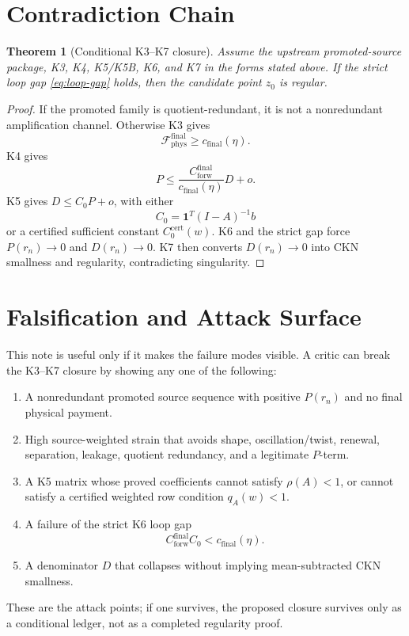\documentclass[11pt]{article}
\newtheorem{theorem}{Theorem}
\begin{document}
\clearpage
\section{Contradiction Chain}
\label{sec:chain}

\begin{theorem}[Conditional K3--K7 closure]
\label{thm:closure}
Assume the upstream promoted-source package, K3, K4, K5/K5B, K6, and K7 in the
forms stated above.  If the strict loop gap \eqref{eq:loop-gap} holds, then the
candidate point \(z_0\) is regular.
\end{theorem}

\begin{proof}
If the promoted family is quotient-redundant, it is not a nonredundant
amplification channel.  Otherwise K3 gives
\[
\mathcal F_{\mathrm{phys}}^{\mathrm{final}}\ge c_{\mathrm{final}}(\eta).
\]
K4 gives
\[
P\le
\frac{C_{\mathrm{forw}}^{\mathrm{final}}}{c_{\mathrm{final}}(\eta)}D+o.
\]
K5 gives \(D\le C_0P+o\), with either
\[
C_0=\mathbf 1^T(I-A)^{-1}b
\]
or a certified sufficient constant \(C_0^{\mathrm{cert}}(w)\).  K6 and the
strict gap force \(P(r_n)\to0\) and \(D(r_n)\to0\).  K7 then converts
\(D(r_n)\to0\) into CKN smallness and regularity, contradicting singularity.
\end{proof}

\clearpage
\section{Falsification and Attack Surface}
\label{sec:attack-surface}

This note is useful only if it makes the failure modes visible.  A critic can
break the K3--K7 closure by showing any one of the following:
\begin{enumerate}
\item A nonredundant promoted source sequence with positive \(P(r_n)\) and no
final physical payment.
\item High source-weighted strain that avoids shape, oscillation/twist,
renewal, separation, leakage, quotient redundancy, and a legitimate \(P\)-term.
\item A K5 matrix whose proved coefficients cannot satisfy
\(\rho(A)<1\), or cannot satisfy a certified weighted row condition
\(q_A(w)<1\).
\item A failure of the strict K6 loop gap
\[
C_{\mathrm{forw}}^{\mathrm{final}}C_0<c_{\mathrm{final}}(\eta).
\]
\item A denominator \(D\) that collapses without implying mean-subtracted CKN
smallness.
\end{enumerate}
These are the attack points; if one survives, the proposed closure survives
only as a conditional ledger, not as a completed regularity proof.
\end{document}
